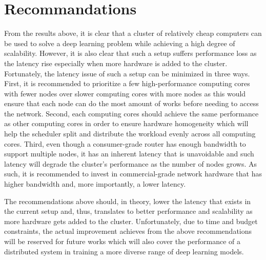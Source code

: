 \documentclass[conference]{IEEEtran}
\begin{document}
    \section{Recommandations}
        From the results above, it is clear that a cluster of relatively cheap computers can be used to solve a deep learning problem while achieving a high degree of scalability. However, it is also clear that such a setup suffers performance loss as the latency rise especially when more hardware is added to the cluster. Fortunately, the latency issue of such a setup can be minimized in three ways. First, it is recommended to prioritize a few high-performance computing cores with fewer nodes over slower computing cores with more nodes as this would ensure that each node can do the most amount of works before needing to access the network. Second, each computing cores should achieve the same performance as other computing cores in order to ensure hardware homogeneity which will help the scheduler split and distribute the workload evenly across all computing cores. Third, even though a consumer-grade router has enough bandwidth to support multiple nodes, it has an inherent latency that is unavoidable and such latency will degrade the cluster's performance as the number of nodes grows. As such, it is recommended to invest in commercial-grade network hardware that has higher bandwidth and, more importantly, a lower latency. 
            
        The recommendations above should, in theory, lower the latency that exists in the current setup and, thus, translates to better performance and scalability as more hardware gets added to the cluster. Unfortunately, due to time and budget constraints, the actual improvement achieves from the above recommendations will be reserved for future works which will also cover the performance of a distributed system in training a more diverse range of deep learning models. 
        
        \nocite{*}

    
    
    
\end{document}

